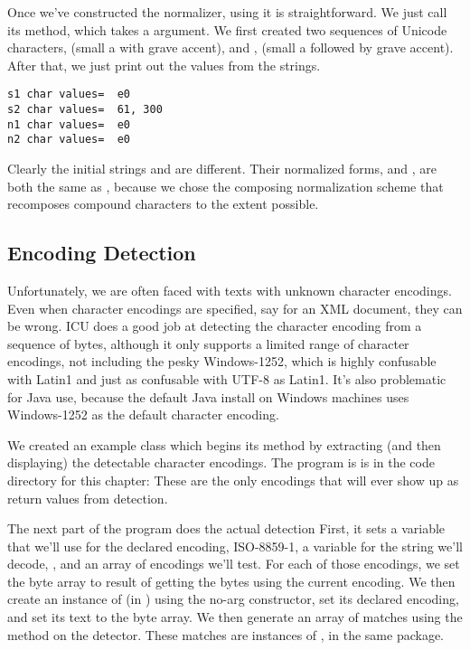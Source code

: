 Once we've constructed the normalizer, using it is straightforward.
We just call its  method, which takes a
 argument.  We first created two sequences of Unicode
characters,  (small a with grave accent), and
,  (small a followed by grave accent).
After that, we just print out the  values from the
strings.

\begin{verbatim}
s1 char values=  e0
s2 char values=  61, 300
n1 char values=  e0
n2 char values=  e0
\end{verbatim}
%
Clearly the initial strings  and  are different.
Their normalized forms,  and , are both the same as
, because we chose the composing normalization scheme that
recomposes compound characters to the extent possible.


\subsection{Encoding Detection}\label{section:encoding-detection}

Unfortunately, we are often faced with texts with unknown character
encodings.  Even when character encodings are specified, say for an
XML document, they can be wrong.  ICU does a good job at detecting the
character encoding from a sequence of bytes, although it only supports
a limited range of character encodings, not including the pesky
Windows-1252, which is highly confusable with Latin1 and just as
confusable with UTF-8 as Latin1.  It's also problematic for Java use,
because the default Java install on Windows machines uses Windows-1252 as
the default character encoding.

We created an example class  which begins its
 method by extracting (and then displaying) the detectable
character encodings.
The program is is in the code directory for this chapter:
%
%
%
These are the only encodings that will ever show up as return values
from detection.  

The next part of the program does the actual detection
%
%
First, it sets a variable that we'll use for the declared encoding,
ISO-8859-1, a variable for the string we'll decode,
, and an array of encodings we'll test.
For each of those encodings, we set the byte array  to result
of getting the bytes using the current encoding.  We then create an
instance of  (in ) using
the no-arg constructor, set its declared encoding, and set its text to
the byte array.  We then generate an array of matches using the
 method on the detector.  These matches are instances
of , in the same package.  

